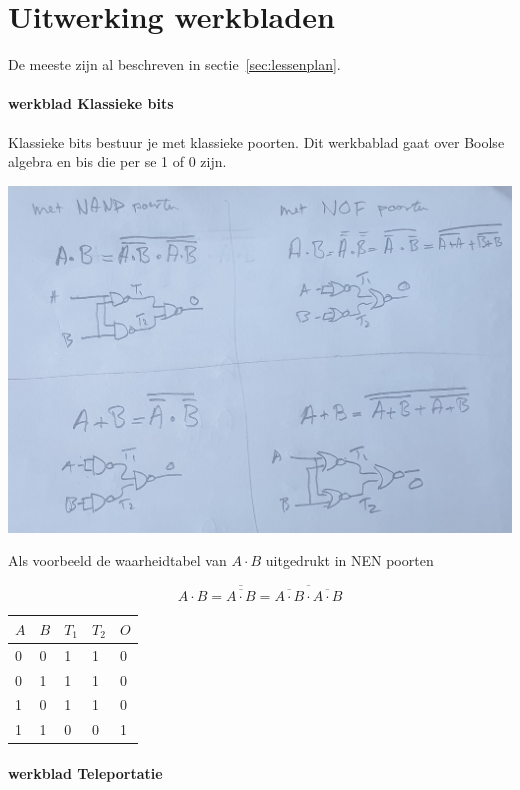 \documentclass[../../main.tex]{subfiles}
\begin{document}
\section{Uitwerking werkbladen}\label{sec:uitwerkbladen}

De meeste zijn al beschreven in sectie~\ref{sec:lessenplan}. 


\paragraph*{werkblad Klassieke bits}

Klassieke bits bestuur je met klassieke poorten. Dit werkbablad gaat over Boolse algebra en bis die per se 1 of 0 zijn. 

\includegraphics[width=\textwidth]{./img/klassiekuitwerking.jpg}

Als voorbeeld de waarheidtabel van $A \cdot B$ uitgedrukt in NEN poorten

\[ A \cdot B= \overline{\overline{{A} \cdot {B}}} = \overline{\overline{A \cdot B} \cdot \overline{A \cdot B}}\]

\begin{tabular}{|l|l|l|l|l|}
\hline
$A$ & $B$ & $T_1$ &$T_2$& $O$\\ \hline
0     & 0     & 1 &  1  &  0 \\ \hline
0     & 1     & 1 &  1  &  0 \\ \hline
1     & 0     & 1 &  1  &  0 \\ \hline
1     & 1     & 0 &  0  &  1 \\ \hline
\end{tabular}

\paragraph*{werkblad Teleportatie}
\end{document}
